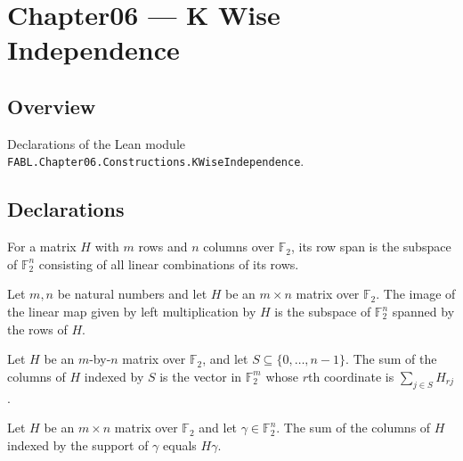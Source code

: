 \chapter{Chapter06 — K Wise Independence}
\section{Overview}

Declarations of the Lean module \texttt{FABL.Chapter06.Constructions.KWiseIndependence}.

\section{Declarations}

\begin{definition}
\label{FABL.matrixRowSpan}
\leanok
{}
For a matrix $H$ with $m$ rows and $n$ columns over $\mathbb{F}_2$, its row span is the
subspace of $\mathbb{F}_2^n$ consisting of all linear combinations of its rows.
\end{definition}

\begin{theorem}
\label{FABL.matrixRowSpan_eq_span_rows}
\leanok
{}
Let $m,n$ be natural numbers and let $H$ be an $m\times n$ matrix over $\mathbb{F}_2$.
The image of the linear map given by left multiplication by $H$ is the subspace of
$\mathbb{F}_2^n$ spanned by the rows of $H$.
\end{theorem}

\begin{definition}
\label{FABL.matrixColumnSum}
\leanok
{}
Let $H$ be an $m$-by-$n$ matrix over $\mathbb F_2$, and let
$S\subseteq\{0,\ldots,n-1\}$. The sum of the columns of $H$ indexed by $S$ is the vector
in $\mathbb F_2^m$ whose $r$th coordinate is $\sum_{j\in S}H_{rj}$.
\end{definition}

\begin{theorem}
\leanok
{}
Let $H$ be an $m\times n$ matrix over $\mathbb F_2$ and let $\gamma\in\mathbb F_2^n$.
The sum of the columns of $H$ indexed by the support of $\gamma$ equals $H\gamma$.
\end{theorem}

